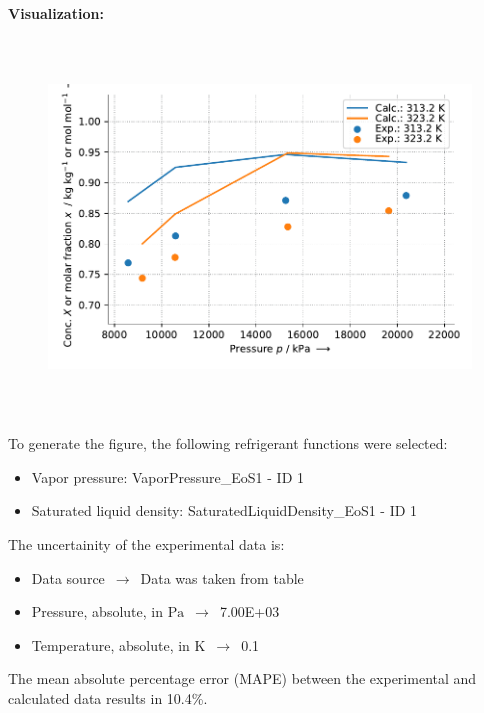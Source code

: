 \textbf{Visualization:}
%
\begin{figure}[!htp]
{\noindent\includegraphics[height=10cm, keepaspectratio]{figs/abs/abs_CarbonDioxide_ionic_liquid_[N4,1,1,1][NTf2]_MixingRule_2.pdf}}
\end{figure}
%

To generate the figure, the following refrigerant functions were selected:
\begin{itemize}
\item Vapor pressure: VaporPressure\_EoS1 - ID 1
\item Saturated liquid density: SaturatedLiquidDensity\_EoS1 - ID 1
\end{itemize}

The uncertainity of the experimental data is:
\begin{itemize}
\item Data source $\,\to\,$ Data was taken from table
\item Pressure, absolute, in $\si{\pascal}$ $\,\to\,$ 7.00E+03
\item Temperature, absolute, in $\si{\kelvin}$ $\,\to\,$ 0.1
\end{itemize}

The mean absolute percentage error (MAPE) between the experimental and calculated data results in 10.4\%.
\FloatBarrier
\newpage
